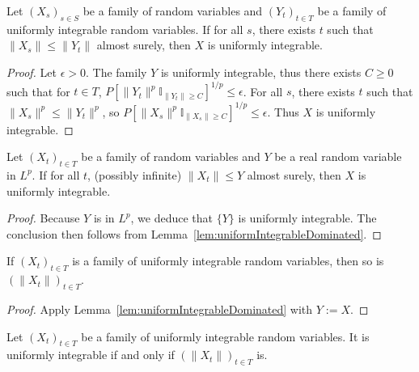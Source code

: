 \begin{lemma}\label{lem:uniformIntegrableDominated}
  \leanok
Let $(X_s)_{s \in S}$ be a family of random variables and $(Y_t)_{t \in T}$ be a family of uniformly integrable random variables. If for all $s$, there exists $t$ such that $\|X_s\| \le \|Y_t\|$ almost surely, then $X$ is uniformly integrable.
\end{lemma}

\begin{proof}

\leanok
Let $\epsilon > 0$. The family $Y$ is uniformly integrable, thus there exists $C \ge 0$ such that for $t \in T$, $P[\|Y_t\|^p \mathbb{I}_{\|Y_t\| \ge C}]^{1/p} \le \epsilon$. For all $s$, there exists $t$ such that $\|X_s\|^p \le \|Y_t\|^p$, so $P[\|X_s\|^p \mathbb{I}_{\|X_s\| \ge C}]^{1/p} \le \epsilon$. Thus $X$ is uniformly integrable.
\end{proof}


\begin{lemma}\label{lem:uniformIntegrableDominatedSingleton}
  \leanok
Let $(X_t)_{t \in T}$ be a family of random variables and $Y$ be a real random variable in $L^p$. If for all $t$, (possibly infinite) $\|X_t\| \le Y$ almost surely, then $X$ is uniformly integrable.
\end{lemma}

\begin{proof}
  \leanok
Because $Y$ is in $L^p$, we deduce that $\{Y\}$ is uniformly integrable. The conclusion then follows from Lemma~\ref{lem:uniformIntegrableDominated}.
\end{proof}

\begin{lemma}\label{lem:uniformIntegrableNorm}
  \leanok
If $(X_t)_{t \in T}$ is a family of uniformly integrable random variables, then so is $(\|X_t\|)_{t \in T}$.
\end{lemma}

\begin{proof}
  \leanok
Apply Lemma~\ref{lem:uniformIntegrableDominated} with $Y := X$.
\end{proof}

\begin{lemma}\label{lem:uniformIntegrableIffNorm}
  \leanok
Let $(X_t)_{t \in T}$ be a family of uniformly integrable random variables. It is uniformly integrable if and only if $(\|X_t\|)_{t \in T}$ is.
\end{lemma}

